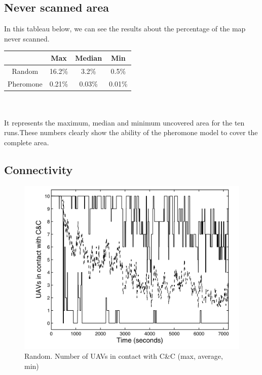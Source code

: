 \subsection{Never scanned area}

In this tableau below, we can see the results about the percentage of the map never scanned.\\

\begin{tabular}{|c|c|c|c|}
\hline
	      & Max & Median & Min \\
	      \hline
	Random & 16.2\% & 3.2\% & 0.5\% \\
	\hline
	Pheromone & 0.21\% & 0.03\% & 0.01\% \\
	\hline
\end{tabular}
\\\\
It represents  the maximum, median and minimum uncovered area for the ten runs.These numbers  clearly  show  the  ability  of  the  pheromone 
model to cover the complete area. 

\subsection{Connectivity}

\begin{figure}[h]
\caption{\label{randomconnect} Random. Number of UAVs in contact with C\&C (max, average, min)}
   \includegraphics{../images/random_resultat_connectivite.png}
\end{figure}

